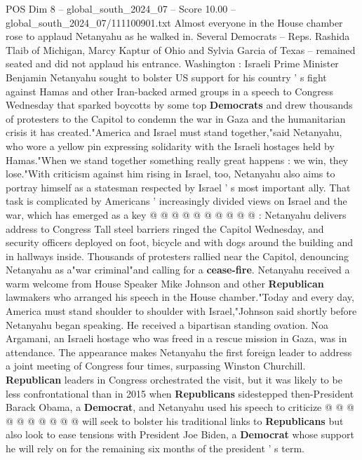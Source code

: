 \begin{textsample}{POS Dim 8 – global\_south\_2024\_07 – Score 10.00 – global\_south\_2024\_07/111100901.txt}  \label{ex:f8_pos_104}
Almost everyone in the House chamber rose to applaud Netanyahu as he walked in.
Several Democrats -- Reps.
Rashida Tlaib of Michigan, Marcy Kaptur of Ohio and Sylvia Garcia of Texas -- remained seated and did not applaud his entrance.
Washington : Israeli Prime Minister Benjamin Netanyahu sought to bolster US support for his country ' s fight against Hamas and other Iran-backed armed groups in a speech to Congress Wednesday that sparked boycotts by some top \textbf{Democrats} and drew thousands of protesters to the Capitol to condemn the war in Gaza and the humanitarian crisis it has created."America and Israel must stand together,"said Netanyahu, who wore a yellow pin expressing solidarity with the Israeli hostages held by Hamas."When we stand together something really great happens : we win, they lose."With criticism against him rising in Israel, too, Netanyahu also aims to portray himself as a statesman respected by Israel ' s most important ally.
That task is complicated by Americans ' increasingly divided views on Israel and the war, which has emerged as a key @ @ @ @ @ @ @ @ @ @ : Netanyahu delivers address to Congress Tall steel barriers ringed the Capitol Wednesday, and security officers deployed on foot, bicycle and with dogs around the building and in hallways inside.
Thousands of protesters rallied near the Capitol, denouncing Netanyahu as a"war criminal"and calling for a \textbf{cease-fire}.
Netanyahu received a warm welcome from House Speaker Mike Johnson and other \textbf{Republican} lawmakers who arranged his speech in the House chamber."Today and every day, America must stand shoulder to shoulder with Israel,"Johnson said shortly before Netanyahu began speaking.
He received a bipartisan standing ovation.
Noa Argamani, an Israeli hostage who was freed in a rescue mission in Gaza, was in attendance.
The appearance makes Netanyahu the first foreign leader to address a joint meeting of Congress four times, surpassing Winston Churchill. \textbf{Republican} leaders in Congress orchestrated the visit, but it was likely to be less confrontational than in 2015 when \textbf{Republicans} sidestepped then-President Barack Obama, a \textbf{Democrat}, and Netanyahu used his speech to criticize @ @ @ @ @ @ @ @ @ @ will seek to bolster his traditional links to \textbf{Republicans} but also look to ease tensions with President Joe Biden, a \textbf{Democrat} whose support he will rely on for the remaining six months of the president ' s term.

\end{textsample}
